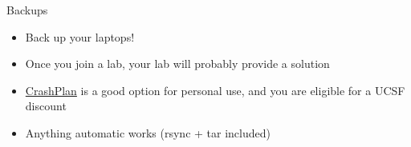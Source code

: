 \begin{frame}{Backups}
  \begin{itemize}
  \item Back up your laptops!
  \item Once you join a lab, your lab will
    probably provide a solution
  \item \href{http://www.code42.com/crashplan/}{CrashPlan}
    is a good option for personal use,
    and you are eligible for a UCSF discount
  \item Anything automatic works (rsync + tar included)
  \end{itemize}
\end{frame}